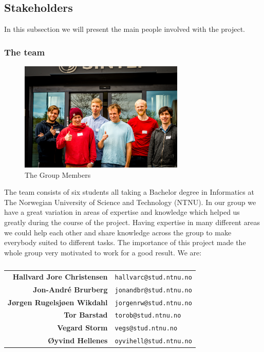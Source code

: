 \subsection{Stakeholders}
In this subsection we will present the main people involved with the project. 

\subsubsection{The team}

\begin{figure}[!ht]
\begin{center}
\includegraphics[width=0.7\textwidth]{res/theTeam.jpg}
\caption{The Group Members}
\end{center}
\end{figure}

The team consists of six students all taking a Bachelor degree in Informatics at The Norwegian University of Science and Technology (NTNU). In our group we have a great variation in areas of expertise and knowledge which helped us greatly during the course of the project. Having expertise in many different areas we could help each other and share knowledge across the group to make everybody suited to different tasks. The importance of this project made the whole group very motivated to work for a good result.
We are:

\begin{table}[!ht]
\begin{tabular}{r|p{11cm}}
\textbf{Hallvard Jore Christensen} & \texttt{hallvarc@stud.ntnu.no}\\[6pt]
\textbf{Jon-André Brurberg} & \texttt{jonandbr@stud.ntnu.no}\\[6pt]
\textbf{Jørgen Rugelsjøen Wikdahl} & \texttt{jorgenrw@stud.ntnu.no}\\[6pt]
\textbf{Tor Barstad} & \texttt{torob@stud.ntnu.no}\\[6pt]
\textbf{Vegard Storm} & \texttt{vegs@stud.ntnu.no}\\[6pt]
\textbf{Øyvind Hellenes} & \texttt{oyvihell@stud.ntnu.no}\\
\end{tabular}
\captionsetup{textformat=empty,labelformat=blank}
\caption[The Team]{}
\end{table}


